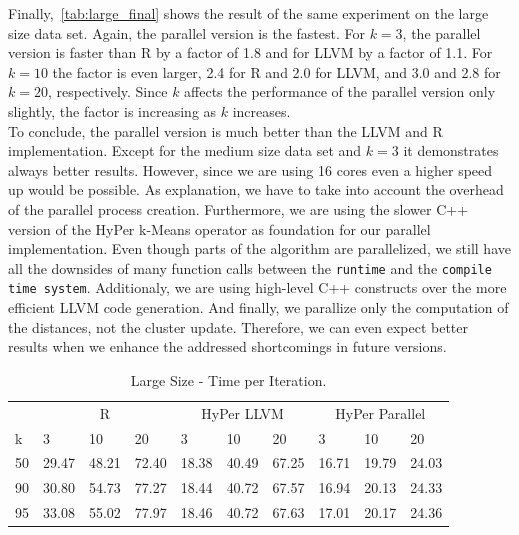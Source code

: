 Finally,~\autoref{tab:large_final} shows the result of the same experiment on the large size data set. Again, the parallel version is the fastest. For $k = 3$, the parallel version is faster than R by a factor of 1.8 and for LLVM by a factor of 1.1. For $k = 10$ the factor is even larger, 2.4 for R and 2.0 for LLVM, and 3.0 and 2.8 for $k = 20$, respectively. Since $k$ affects the performance of the parallel version only slightly, the factor is increasing as $k$ increases.
\\
To conclude, the parallel version is much better than the LLVM and R implementation. Except for the medium size data set and $k = 3$ it demonstrates always better results. However, since we are using 16 cores even a higher speed up would be possible. As explanation, we have to take into account the overhead of the parallel process creation. Furthermore, we are using the slower C++ version of the HyPer k-Means operator as foundation for our parallel implementation. Even though parts of the algorithm are parallelized, we still have all the downsides of many function calls between the \texttt{runtime} and the \texttt{compile time system}. Additionaly, we are using high-level C++ constructs over the more efficient LLVM code generation. And finally, we parallize only the computation of the distances, not the cluster update. Therefore, we can even expect better results when we enhance the addressed shortcomings in future versions.


\begin{table}[htsb]
  \caption[Large Size - Time per Iteration]{Large Size - Time per Iteration.}
  \label{tab:large_final}
  \centering
  \begin{tabular}{l l l l l l l l l l }
    \toprule
      & \multicolumn{3}{c}{R} & \multicolumn{3}{c}{HyPer LLVM} & \multicolumn{3}{c}{HyPer Parallel}  \\
      k & 3 & 10 & 20 & 3 & 10 & 20 & 3 & 10 & 20 \\
    \midrule
      50  & 29.47 & 48.21 & 72.40 & 18.38 & 40.49 & 67.25 & 16.71 & 19.79 & 24.03 \\
      90  & 30.80 & 54.73 & 77.27 & 18.44 & 40.72 & 67.57 & 16.94 & 20.13 & 24.33 \\
      95  & 33.08 & 55.02 & 77.97 & 18.46 & 40.72 & 67.63 & 17.01 & 20.17 & 24.36 \\
    \bottomrule
  \end{tabular}
\end{table}




